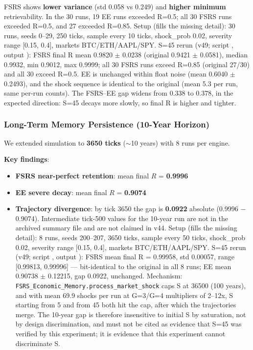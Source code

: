 \documentclass[11pt]{article}
\begin{document}
FSRS shows \textbf{lower variance} (std 0.058 vs 0.249) and \textbf{higher minimum} retrievability. In the 30 runs, 19 EE runs exceeded R=0.5; all 30 FSRS runs exceeded R=0.5, and 27 exceeded R=0.85. Setup (fills the missing detail): 30 runs, seeds 0--29, 250 ticks, sample every 10 ticks, shock\_prob 0.02, severity range [0.15, 0.4], markets BTC/ETH/AAPL/SPY. S=45 rerun (v49; script , output ): FSRS final R mean 0.9820 $\pm$ 0.0238 (original 0.9421 $\pm$ 0.0581), median 0.9932, min 0.9012, max 0.9999; all 30 FSRS runs exceed R=0.85 (original 27/30) and all 30 exceed R=0.5. EE is unchanged within float noise (mean 0.6040 $\pm$ 0.2493), and the shock sequence is identical to the original (mean 5.3 per run, same per-run counts). The FSRS--EE gap widens from 0.338 to 0.378, in the expected direction: S=45 decays more slowly, so final R is higher and tighter.

\subsubsection{Long-Term Memory Persistence (10-Year Horizon)}
We extended simulation to \textbf{3650 ticks} ($\sim$10 years) with 8 runs per engine.

\textbf{Key findings}:

\begin{itemize}
\item \textbf{FSRS near-perfect retention}: mean final $R$ = \textbf{0.9996}
\item \textbf{EE severe decay}: mean final $R$ = \textbf{0.9074}
\item \textbf{Trajectory divergence}: by tick 3650 the gap is \textbf{0.0922} absolute (0.9996 $-$ 0.9074). Intermediate tick-500 values for the 10-year run are not in the archived summary file and are not claimed in v44. Setup (fills the missing detail): 8 runs, seeds 200--207, 3650 ticks, sample every 50 ticks, shock\_prob 0.02, severity range [0.15, 0.4], markets BTC/ETH/AAPL/SPY. S=45 rerun (v49; script , output ): FSRS mean final R = 0.99958, std 0.00057, range [0.99813, 0.99996] --- bit-identical to the original in all 8 runs; EE mean 0.90738 $\pm$ 0.12215, gap 0.0922, unchanged. Mechanism: \texttt{FSRS\_Economic\_Memory.process\_market\_shock} caps S at 36500 (100 years), and with mean 69.9 shocks per run at G=3/G=4 multipliers of 2--12x, S starting from 5 and from 45 both hit the cap, after which the trajectories merge. The 10-year gap is therefore insensitive to initial S by saturation, not by design discrimination, and must not be cited as evidence that S=45 was verified by this experiment; it is evidence that this experiment cannot discriminate S.
\end{itemize}
\end{document}
